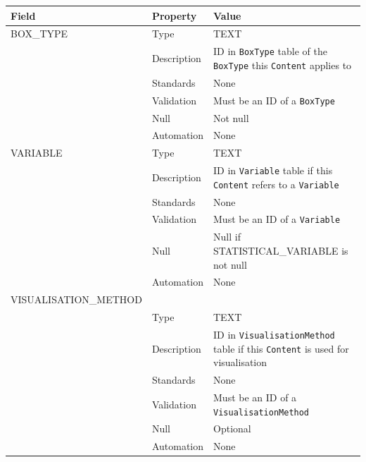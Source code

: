 \documentclass[
]{article}
\newcounter{none} %
\begin{document}
{\def\LTcaptype{none} %
\begin{longtable}[]{@{}
  >{\raggedright\arraybackslash}p{}
  >{\raggedright\arraybackslash}p{}
  >{\raggedright\arraybackslash}p{}@{}}
\toprule\noalign{}
\begin{minipage}[b]{\linewidth}\raggedright
Field
\end{minipage} & \begin{minipage}[b]{\linewidth}\raggedright
Property
\end{minipage} & \begin{minipage}[b]{\linewidth}\raggedright
Value
\end{minipage} \\
\midrule\noalign{}
\endhead
\bottomrule\noalign{}
\endlastfoot
BOX\_TYPE & Type & TEXT \\
& Description & ID in \texttt{BoxType} table of the \texttt{BoxType}
this \texttt{Content} applies to \\
& Standards & None \\
& Validation & Must be an ID of a \texttt{BoxType} \\
& Null & Not null \\
& Automation & None \\
VARIABLE & Type & TEXT \\
& Description & ID in \texttt{Variable} table if this \texttt{Content}
refers to a \texttt{Variable} \\
& Standards & None \\
& Validation & Must be an ID of a \texttt{Variable} \\
& Null & Null if STATISTICAL\_VARIABLE is not null \\
& Automation & None \\
VISUALISATION\_METHOD & & \\
& Type & TEXT \\
& Description & ID in \texttt{VisualisationMethod} table if this
\texttt{Content} is used for visualisation \\
& Standards & None \\
& Validation & Must be an ID of a \texttt{VisualisationMethod} \\
& Null & Optional \\
& Automation & None \\
\end{longtable}
}
\end{document}
